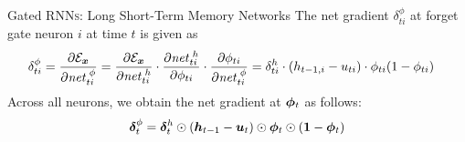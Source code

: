 \begin{frame}{Gated RNN\textsc{s}: Long Short-Term Memory Networks}
The net gradient $\delta_{ti}^\phi$ 
at forget gate neuron $i$ at time $t$ is given as
\begin{align*}
    \delta_{ti}^\phi = 
    \frac{\partial {\mathcal E}_{\boldsymbol x}}{\partial \mathit{net}^{\;\phi}_{ti}} & = 
    \frac{\partial {\mathcal E}_{\boldsymbol x}}{\partial \mathit{net}^{\;h}_{ti}} \cdot
    \frac{\partial \mathit{net}^{\;h}_{ti}}{\partial \phi_{ti}} \cdot
    \frac{\partial \phi_{ti}}{\partial \mathit{net}^{\;\phi}_{ti}}
    = \delta^h_{ti} \cdot (h_{t-1,i} - u_{ti}) \cdot \phi_{ti}
    (1-\phi_{ti})
\end{align*}
Across all neurons, we obtain the net gradient at
${\bm \phi}_t$ as follows:
\begin{align*}
    {\bm \delta}^\phi_t = {\bm \delta}^h_{t} \odot ({\boldsymbol h}_{t-1} - {\boldsymbol u}_t) 
    \odot {\bm \phi}_t \odot (\mathbf{1} - {\bm \phi}_t)
\end{align*}
%

\end{frame}
